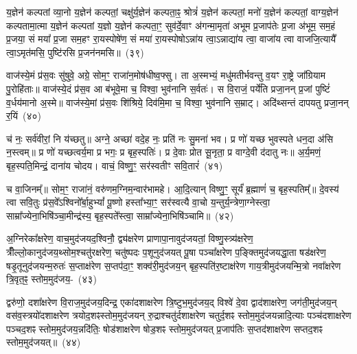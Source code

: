 य॒ज्ञेन॑ कल्पतां व्या॒नो य॒ज्ञेन॑ कल्पतां॒ चक्षु॑र्य॒ज्ञेन॑ कल्पता॒ꣴ॒ श्रोत्रं॑ य॒ज्ञेन॑ कल्पतां॒ मनो॑ य॒ज्ञेन॑ कल्पतां॒ वाग्य॒ज्ञेन॑ कल्पतामा॒त्मा य॒ज्ञेन॑ कल्पतां य॒ज्ञो य॒ज्ञेन॑ कल्पता॒ꣳ॒ सुव॑र्दे॒वाꣳ अ॑गन्मा॒मृता॑ अभूम प्र॒जा\-प॑तेः प्र॒जा अ॑भूम॒ सम॒हं प्र॒जया॒ सं मया᳚ प्र॒जा सम॒हꣳ रा॒यस्पोषे॑ण॒ सं मया॑ रा॒यस्पोषो\-ऽन्ना॑य त्वा॒\-ऽन्नाद्या॑य त्वा॒ वाजा॑य त्वा वाजजि॒त्यायै᳚ त्वा॒\-ऽमृत॑मसि॒ पुष्टि॑रसि प्र॒जन॑नमसि॥~(३९)

{\anuvakamend[{अ॒पा॒नो वाजा॑य॒ नव॑ च}]}%

वाज॑स्ये॒मं प्र॑स॒वः सु॑षुवे॒ अग्रे॒ सोम॒ꣳ॒ राजा॑न॒मोष॑धीष्व॒फ्सु। ता अ॒स्मभ्यं॒ मधु॑मतीर्भवन्तु व॒यꣳ रा॒ष्ट्रे जा᳚ग्रियाम पु॒रोहि॑ताः॥ वाज॑स्ये॒दं प्र॑स॒व आ ब॑भूवे॒मा च॒ विश्वा॒ भुव॑नानि स॒र्वतः॑। स वि॒राजं॒ पर्ये॑ति प्रजा॒नन् प्र॒जां पुष्टिं॑ व॒र्धय॑मानो अ॒स्मे॥ वाज॑स्ये॒मां प्र॑स॒वः शि॑श्रिये॒ दिव॑मि॒मा च॒ विश्वा॒ भुव॑नानि स॒म्राट्। अदि॑थ्सन्तं दापयतु प्रजा॒नन् र॒यिं~(४०)

च॑ नः॒ सर्व॑वीरां॒ नि य॑च्छतु॥ अग्ने॒ अच्छा॑ वदे॒ह नः॒ प्रति॑ नः सु॒मना॑ भव। प्र णो॑ यच्छ भुवस्पते धन॒दा अ॑सि न॒स्त्वम्॥ प्र णो॑ यच्छत्वर्य॒मा प्र भगः॒ प्र बृह॒स्पतिः॑। प्र दे॒वाः प्रोत सू॒नृता॒ प्र वाग्दे॒वी द॑दातु नः॥ अ॒र्य॒मणं॒ बृह॒स्पति॒मिन्द्रं॒ दाना॑य चोदय। वाचं॒ विष्णु॒ꣳ॒ सर॑स्वतीꣳ सवि॒तारं॑~(४१)

च वा॒जिनम्᳚॥ सोम॒ꣳ॒ राजा॑नं॒ वरु॑णम॒ग्निम॒न्वार॑भामहे। आ॒दि॒त्यान् विष्णु॒ꣳ॒ सूर्यं॑ ब्र॒ह्माणं॑ च॒ बृह॒स्पतिम्᳚॥ दे॒वस्य॑ त्वा सवि॒तुः प्र॑स॒वे᳚\-ऽश्विनो᳚र्बा॒हु\-भ्यां᳚ पू॒ष्णो हस्ता᳚भ्या॒ꣳ॒ सर॑स्वत्यै वा॒चो य॒न्तुर्य॒न्त्रेणा॒ग्नेस्त्वा॒ साम्रा᳚ज्येना॒भिषि॑ञ्चा॒मीन्द्र॑स्य॒ बृह॒स्पते᳚स्त्वा॒ साम्रा᳚ज्येना॒भिषि॑ञ्चामि॥~(४२)

{\anuvakamend[{र॒यिꣳ स॑वि॒तार॒ꣳ॒ षट्त्रिꣳ॑शच्च}]}%

अ॒ग्निरेका᳚क्षरेण॒ वाच॒मुद॑जयद॒श्विनौ॒ द्व्य॑क्षरेण प्राणा\-पा॒ना\-वुद॑\-जयतां॒ विष्णु॒स्त्र्य॑क्षरेण॒ त्रीँल्लो॒कानुद॑जय॒थ्सोम॒श्चतु॑रक्षरेण॒ चतु॑ष्पदः प॒शूनुद॑जयत् पू॒षा पञ्चा᳚क्षरेण प॒ङ्क्तिमुद॑जयद्धा॒ता षड॑क्षरेण॒ षडृ॒तूनुद॑जयन्म॒रुतः॑ स॒प्ताक्ष॑रेण स॒प्तप॑दा॒ꣳ॒ शक्व॑री॒मुद॑जय॒न् बृह॒स्पति॑र॒ष्टाक्ष॑रेण गाय॒त्रीमुद॑जयन्मि॒त्रो नवा᳚क्षरेण त्रि॒वृत॒ꣴ॒ स्तोम॒मुद॑जय॒-~(४३)

द्वरु॑णो॒ दशा᳚क्षरेण वि॒राज॒मुद॑जय॒दिन्द्र॒ एका॑\-दशा\-क्षरेण त्रि॒ष्टुभ॒मुद॑जय॒द् विश्वे॑ दे॒वा द्वाद॑शाक्षरेण॒ जग॑ती॒मुद॑जय॒न् वस॑व॒स्त्रयो॑\-दशा\-क्षरेण त्रयोद॒शꣴस्तोम॒मुद॑जयन् रु॒द्राश्चतु॑र्दशा\-क्षरेण चतुर्द॒शꣴ स्तोम॒मुद॑जयन्नादि॒त्याः पञ्च॑\-दशा\-क्षरेण पञ्चद॒शꣴ स्तोम॒मुद॑जय॒न्नदि॑तिः॒ षोड॑शाक्षरेण षोड॒शꣴ स्तोम॒मुद॑जयत् प्र॒जा\-प॑तिः स॒प्तद॑शाक्षरेण सप्तद॒शꣴ स्तोम॒मुद॑जयत्॥~(४४)

